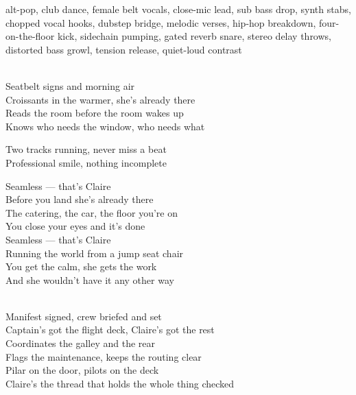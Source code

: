 

\begin{notes}
\end{notes}

\begin{style}
alt-pop, club dance, female belt vocals, close-mic lead, sub bass drop, synth stabs, chopped vocal hooks, dubstep bridge, melodic verses, hip-hop breakdown, four-on-the-floor kick, sidechain pumping, gated reverb snare, stereo delay throws, distorted bass growl, tension release, quiet-loud contrast
\end{style}

\begin{lyrics}

\\
Seatbelt signs and morning air\\
Croissants in the warmer, she's already there\\
Reads the room before the room wakes up\\
Knows who needs the window, who needs what

Two tracks running, never miss a beat\\
Professional smile, nothing incomplete

Seamless — that's Claire\\
Before you land she's already there\\
The catering, the car, the floor you're on\\
You close your eyes and it's done\\
Seamless — that's Claire\\
Running the world from a jump seat chair\\
You get the calm, she gets the work\\
And she wouldn't have it any other way

\\
Manifest signed, crew briefed and set\\
Captain's got the flight deck, Claire's got the rest\\
Coordinates the galley and the rear\\
Flags the maintenance, keeps the routing clear\\
Pilar on the door, pilots on the deck\\
Claire's the thread that holds the whole thing checked


\end{lyrics}
